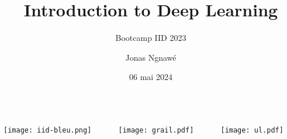 \documentclass[english,usenames,dvipsnames]{beamer}
\title[]{Introduction to Deep Learning}
\subtitle{Bootcamp IID 2023}
\author[J. Ngnawé]{Jonas Ngnawé}
\institute{\texttt{\{jonas.ngnawe.1\}@ulaval.ca}}
\date[]{06 mai 2024}
\begin{document}
\begin{frame}[nonum]
\titlepage
\begin{center}
	\vspace{-10mm}
	\begin{columns}
		\begin{column}{0.33\textwidth}
			\texttt{[image: iid-bleu.png]}
		\end{column}
		\begin{column}{0.33\textwidth}
			\texttt{[image: grail.pdf]}
		\end{column}
		\begin{column}{0.33\textwidth}
			\hspace{-5mm}
			\texttt{[image: ul.pdf]}
		\end{column}
	\end{columns}
\end{center}
\end{frame}

\begin{frame}[nonum]
	\tableofcontents[subsubsectionstyle=hide/hide]
\end{frame}
\end{document}
